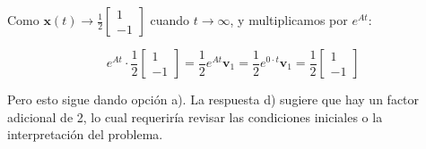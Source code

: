 \begin{solbox}
Como $\mathbf{x}(t) \to \frac{1}{2}\begin{bmatrix}1\\-1\end{bmatrix}$ cuando $t \to \infty$, y multiplicamos por $e^{At}$:

$$e^{At} \cdot \frac{1}{2}\begin{bmatrix}1\\-1\end{bmatrix} = \frac{1}{2}e^{At}\mathbf{v}_1 = \frac{1}{2}e^{0 \cdot t}\mathbf{v}_1 = \frac{1}{2}\begin{bmatrix}1\\-1\end{bmatrix}$$

Pero esto sigue dando opción a). La respuesta d) sugiere que hay un factor adicional de 2, lo cual requeriría revisar las condiciones iniciales o la interpretación del problema.
\end{solbox}

